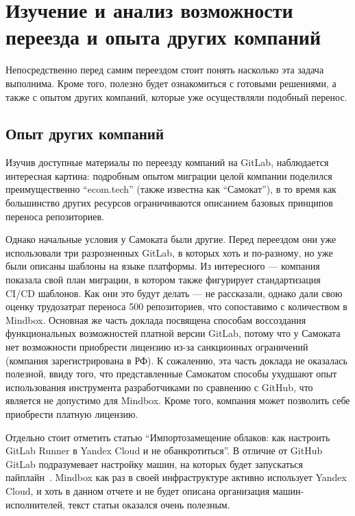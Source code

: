 \chapter{Изучение и анализ возможности переезда и опыта других компаний} \label{ch:ch1}
Непосредственно перед самим переездом стоит понять насколько эта задача выполнима.
Кроме того, полезно будет ознакомиться с готовыми решениями, а также с опытом других компаний, которые уже осуществляли подобный перенос.

\section{Опыт других компаний}\label{sec:other-companies-expirience}
Изучив доступные материалы по переезду компаний на GitLab,
наблюдается интересная картина: подробным опытом миграции целой компании поделился преимущественно \enquote{ecom.tech}
(также известна как \enquote{Самокат})\cite{samokat-conference-talk},
в то время как большинство других ресурсов ограничиваются описанием базовых принципов переноса репозиториев.

Однако начальные условия у Самоката были другие.
Перед переездом они уже использовали три разрозненных GitLab, в которых хоть и по-разному, но уже были описаны шаблоны на языке платформы.
Из интересного — компания показала свой план миграции, в котором также фигурирует стандартизация CI/CD шаблонов.
Как они это будут делать — не рассказали, однако дали свою оценку трудозатрат переноса 500 репозиториев, что сопоставимо с количеством в Mindbox.
Основная же часть доклада посвящена способам воссоздания функциональных возможностей платной версии GitLab, потому что у
Самоката нет возможности приобрести лицензию из-за санкционных ограничений (компания зарегистрирована в РФ).
К сожалению, эта часть доклада не оказалась полезной,
ввиду того, что представленные Самокатом способы ухудшают опыт использования инструмента разработчиками по сравнению с GitHub,
что является не допустимо для Mindbox.
Кроме того, компания может позволить себе приобрести платную лицензию.

Отдельно стоит отметить статью \enquote{Импортозамещение облаков: как настроить GitLab Runner в Yandex Cloud и не обанкротиться}\cite{yc-runners-article}.
В отличие от GitHub GitLab подразумевает настройку машин, на которых будет запускаться пайплайн~\cite{gl-runners}.
Mindbox как раз в своей инфраструктуре активно использует Yandex Cloud\cite{yc}, и хоть в данном отчете и не будет описана организация машин-исполнителей,
текст статьи оказался очень полезным.

